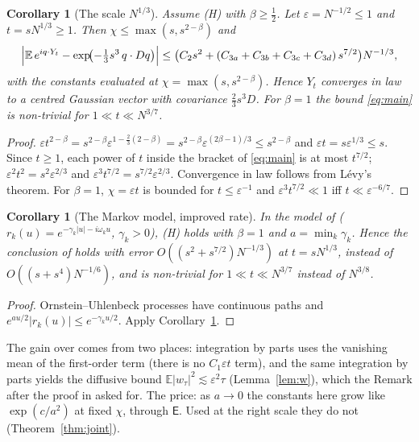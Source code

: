\documentclass[11pt]{article}
\newcommand{\E}{\mathbb{E}}
\newcommand{\eps}{\varepsilon}
\newcommand{\sE}{\mathsf{E}}
\newtheorem{corollary}[theorem]{Corollary}
\theoremstyle{remark}
\begin{document}
\begin{corollary}[The scale $N^{1/3}$]\label{cor:law}
Assume \textup{(H)} with $\beta\ge\frac12$. Let $\eps = N^{-1/2}\le1$ and
$t = sN^{1/3}\ge1$. Then $\chi\le\max(s,s^{2-\beta})$ and
\[
  \Bigl|\E\,e^{iq\cdot Y_t} - \exp\!\bigl(-\tfrac13s^3\,q\cdot Dq\bigr)\Bigr|
  \le \bigl(C_2s^2 + (C_{3a}+C_{3b}+C_{3c}+C_{3d})\,s^{7/2}\bigr)N^{-1/3},
\]
with the constants evaluated at $\chi = \max(s,s^{2-\beta})$. Hence $Y_t$
converges in law to a centred Gaussian vector with covariance
$\frac23s^3D$. For $\beta=1$ the bound \eqref{eq:main} is non-trivial for
$1\ll t\ll N^{3/7}$.
\end{corollary}

\begin{proof}
$\eps t^{2-\beta} = s^{2-\beta}\eps^{1-\frac23(2-\beta)}
= s^{2-\beta}\eps^{(2\beta-1)/3}\le s^{2-\beta}$ and
$\eps t = s\eps^{1/3}\le s$. Since $t\ge1$, each power of $t$ inside the
bracket of \eqref{eq:main} is at most $t^{7/2}$;
$\eps^2t^2 = s^2\eps^{2/3}$ and $\eps^3t^{7/2} = s^{7/2}\eps^{2/3}$.
Convergence in law follows from L\'evy's theorem. For $\beta=1$,
$\chi=\eps t$ is bounded for $t\le\eps^{-1}$ and
$\eps^3t^{7/2}\ll1$ iff $t\ll\eps^{-6/7}$.
\end{proof}

\begin{corollary}[The Markov model, improved rate]\label{cor:ou}
In the model of \cite{Note} \textup{(}$r_k(u) = e^{-\gamma_k|u|-i\omega_ku}$,
$\gamma_k>0$\textup{)}, \textup{(H)} holds with $\beta=1$ and
$a = \min_k\gamma_k$. Hence the conclusion of \cite[Theorem~1]{Note} holds
with error $O((s^2+s^{7/2})N^{-1/3})$ at $t = sN^{1/3}$, instead of
$O((s+s^4)N^{-1/6})$, and is non-trivial for $1\ll t\ll N^{3/7}$ instead of
$N^{3/8}$.
\end{corollary}

\begin{proof}
Ornstein--Uhlenbeck processes have continuous paths and
$e^{au/2}|r_k(u)|\le e^{-\gamma_ku/2}$. Apply Corollary~\ref{cor:law}.
\end{proof}

The gain over \cite{Note} comes from two places: integration by parts uses
the vanishing mean of the first-order term (there is no $C_1\eps t$ term),
and the same integration by parts yields the diffusive bound
$\E|w_\tau|^2\lesssim\eps^2\tau$ (Lemma~\ref{lem:w}), which the Remark after
the proof in \cite{Note} asked for. The price: as $a\to0$ the constants here
grow like $\exp(c/a^2)$ at fixed $\chi$, through $\sE$. Used at the right
scale they do not (Theorem~\ref{thm:joint}).
\end{document}
